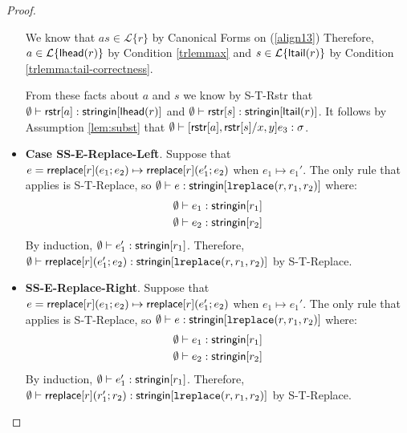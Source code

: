 \documentclass[11pt,leqno]{article}
\theoremstyle{definition}
\newcommand{\Lagr}{\mathcal{L}}
\newcommand{\lang}[1]{\Lagr\{#1\}}
\newcommand{\stringin}[1]{{\sf stringin}[#1]}
\newcommand{\lreplace}[3]{{\sf lreplace}(#1; #2; #3)}
\newcommand{\lhead}[1]{ {\sf lhead}(#1) }
\newcommand{\ltail}[1]{ {\sf ltail}(#1) }
\renewcommand{\lreplace}[3]{{\tt lreplace}(#1, #2, #3)}
\begin{document}
\begin{proof}
\begin{itemize}[label=$ $,itemsep=1ex]
We know that $as \in \lang{r}$ by Canonical Forms on (\ref{align13}) 
Therefore, $a \in \lang{\lhead{r}}$ by Condition \ref{trlemmax} and $s \in \lang{\ltail{r}}$ by Condition \ref{trlemma:tail-correctness}. 

From these facts about $a$ and $s$ we know by S-T-Rstr that $\emptyset\vdash \rstr{a} : \stringin{\lhead{r}}$
and $\emptyset\vdash \rstr{s} : \stringin{\ltail{r}}$.
It follows by Assumption \ref{lem:subst} that  $\emptyset\vdash [{\sf rstr}[a], {\sf rstr}[s] / x,y] e_3 : \sigma$.

\item \textbf{Case SS-E-Replace-Left}.
Suppose that $e = {\sf rreplace}[r](e_1;e_2) \mapsto {\sf rreplace}[r](e_1';e_2)$ when $e_1 \mapsto e_1'$.
The only rule that applies is S-T-Replace, so
$\emptyset \vdash e : \stringin{\lreplace{r}{r_1}{r_2}}$ where:
\begin{align*}
\emptyset &\vdash e_1 : \stringin{r_1} \\
\emptyset &\vdash e_2 : \stringin{r_2}
\end{align*}
By induction, $\emptyset \vdash e_1' : \stringin{r_1}$.
Therefore, $\emptyset \vdash \rreplace{r}{e_1'}{e_2} : \stringin{\lreplace{r}{r_1}{r_2}}$ by S-T-Replace.

\item \textbf{SS-E-Replace-Right}.
Suppose that $e = {\sf rreplace}[r](e_1;e_2) \mapsto {\sf rreplace}[r](e_1';e_2)$ when $e_1 \mapsto e_1'$.
The only rule that applies is S-T-Replace, so
$\emptyset \vdash e : \stringin{\lreplace{r}{r_1}{r_2}}$ where:
\begin{align*}
\emptyset &\vdash e_1 : \stringin{r_1} \\
\emptyset &\vdash e_2 : \stringin{r_2}
\end{align*}
By induction, $\emptyset \vdash e_1' : \stringin{r_1}$.
Therefore, $\emptyset \vdash \rreplace{r}{r_1'}{r_2} : \stringin{\lreplace{r}{r_1}{r_2}}$ by S-T-Replace.


\end{itemize}
\end{proof}
\end{document}
